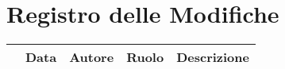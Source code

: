 \thispagestyle{empty}
\section*{Registro delle Modifiche}

\begin{center}
	\renewcommand{\arraystretch}{1.8}
	\begin{longtable}[c]{c | c | c | c | p{5cm}}
		\rowcolor[HTML]{125E28}
		\multicolumn{1}{c}{\color[HTML]{FFFFFF} \textbf{Versione}} &
		\multicolumn{1}{c}{\color[HTML]{FFFFFF} \textbf{Data}}     &
		\multicolumn{1}{c}{\color[HTML]{FFFFFF} \textbf{Autore}}   &
		\multicolumn{1}{c}{\color[HTML]{FFFFFF} \textbf{Ruolo}}    &
		\multicolumn{1}{c}{\color[HTML]{FFFFFF} \textbf{Descrizione}}                                                                                                                                                                                               \\
		\endhead


\end{longtable}
\end{center}
